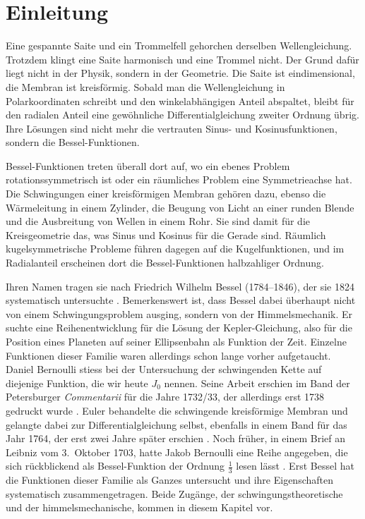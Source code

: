 %
%
%
%
\section{Einleitung\label{bessel:section:einleitung}}
Eine gespannte Saite und ein Trommelfell gehorchen derselben Wellengleichung.
Trotzdem klingt eine Saite harmonisch und eine Trommel nicht.
Der Grund dafür liegt nicht in der Physik, sondern in der Geometrie.
Die Saite ist eindimensional, die Membran ist kreisförmig.
Sobald man die Wellengleichung in Polarkoordinaten schreibt und den winkelabhängigen Anteil abspaltet, bleibt für den radialen Anteil eine gewöhnliche Differentialgleichung zweiter Ordnung übrig.
Ihre Lösungen sind nicht mehr die vertrauten Sinus- und Kosinusfunktionen, sondern die Bessel-Funktionen.
%

Bessel-Funktionen treten überall dort auf, wo ein ebenes Problem rotationssymmetrisch ist oder ein räumliches Problem eine Symmetrieachse hat.
Die Schwingungen einer kreisförmigen Membran gehören dazu, ebenso die Wärmeleitung in einem Zylinder, die Beugung von Licht an einer runden Blende und die Ausbreitung von Wellen in einem Rohr.
Sie sind damit für die Kreisgeometrie das, was Sinus und Kosinus für die Gerade sind.
Räumlich kugelsymmetrische Probleme führen dagegen auf die Kugelfunktionen, und im Radialanteil erscheinen dort die Bessel-Funktionen halbzahliger Ordnung.

Ihren Namen tragen sie nach Friedrich Wilhelm Bessel (1784--1846), der sie 1824 systematisch untersuchte \cite{bessel:bessel1824}.
%
Bemerkenswert ist, dass Bessel dabei überhaupt nicht von einem Schwingungsproblem ausging, sondern von der Himmelsmechanik.
Er suchte eine Reihenentwicklung für die Lösung der Kepler-Gleichung, also für die Position eines Planeten auf seiner Ellipsenbahn als Funktion der Zeit.
Einzelne Funktionen dieser Familie waren allerdings schon lange vorher aufgetaucht.
Daniel Bernoulli stiess bei der Untersuchung der schwingenden Kette auf diejenige Funktion, die wir heute $J_0$ nennen.
%
Seine Arbeit erschien im Band der Petersburger \emph{Commentarii} für die Jahre 1732/33, der allerdings erst 1738 gedruckt wurde \cite{bessel:bernoulli1732}.
Euler behandelte die schwingende kreisförmige Membran und gelangte dabei zur Differentialgleichung selbst, ebenfalls in einem Band für das Jahr 1764, der erst zwei Jahre später erschien \cite{bessel:euler1764}.
%
Noch früher, in einem Brief an Leibniz vom 3.~Oktober 1703, hatte Jakob Bernoulli eine Reihe angegeben, die sich rückblickend als Bessel-Funktion der Ordnung $\frac13$ lesen lässt \cite{bessel:dutka1995}.
%
%
Erst Bessel hat die Funktionen dieser Familie als Ganzes untersucht und ihre Eigenschaften systematisch zusammengetragen.
Beide Zugänge, der schwingungstheoretische und der himmelsmechanische, kommen in diesem Kapitel vor.

